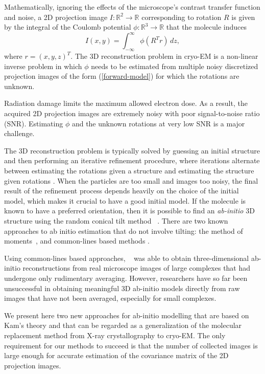 \documentclass{article}
\begin{document}
Mathematically, ignoring the effects of the microscope's contrast transfer function and noise, a 2D projection image $I:\mathbb{R}^2\to \mathbb{R}$ corresponding to rotation $R$ is given by the integral of the Coulomb potential $\phi : \mathbb{R}^3 \to \mathbb{R}$ that the molecule induces
\begin{equation}
\label{forward-model}
I(x,y) = \int_{-\infty}^\infty \phi(R^T r)\,dz,
\end{equation}
where $r = (x, y, z)^T$. The 3D reconstruction problem in cryo-EM is a non-linear inverse problem in which $\phi$ needs to be estimated from multiple noisy discretized projection images of the form (\ref{forward-model}) for which the rotations are unknown.

Radiation damage limits the maximum allowed electron dose. As a result, the acquired 2D projection images are extremely noisy with poor signal-to-noise ratio (SNR). Estimating $\phi$ and the unknown rotations at very low SNR is a major challenge.

The 3D reconstruction problem is typically solved by guessing an initial structure and then performing an iterative refinement procedure, where iterations alternate between estimating the rotations given a structure and estimating the structure given rotations \cite{Frank1, vanheel00, gridding}. When the particles
are too small and images too noisy, the final result of the refinement process
depends heavily on the choice of the initial model, which makes
it crucial to have a good initial model. If the molecule is known to have a
preferred orientation, then it is possible to
find an \textit{ab-initio} 3D structure using the random conical tilt
method ~\cite{Radermacher, Radermacher2}. There are two known approaches to ab initio estimation that do not involve tilting: the
method of moments~\cite{Goncharov,Salzman}, and common-lines based methods \cite{Goncharov1986,vanHeel1987,SS_11}. 

Using common-lines based approaches, ~\cite{Zhao} was able to obtain three-dimensional
ab-initio reconstructions from real microscope
images of large complexes that had undergone only rudimentary averaging.
However, 
researchers have so far been
unsuccessful in obtaining meaningful 3D ab-initio models directly from raw
images that have not been averaged, especially for small complexes.

We present here two new approaches for ab-initio modelling that are based on Kam's theory \cite{kam1980} and that can be regarded
as a generalization of the molecular
replacement method from X-ray crystallography to cryo-EM. The only requirement
for our methods to
succeed is that the number of collected images is large enough for accurate estimation of the covariance matrix of the 2D projection images.
\end{document}
